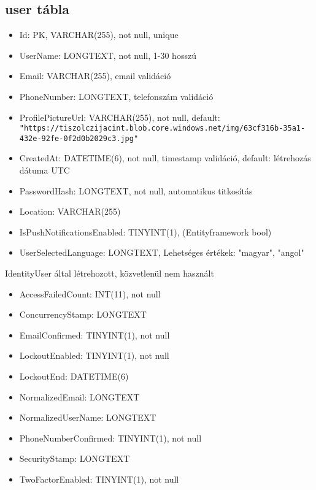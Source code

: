 \documentclass[11pt]{article}
\begin{document}
\subsection{user tábla}
\label{sec:org12ebd85}
\begin{itemize}
\item Id: PK, VARCHAR(255), not null, unique
\item UserName: LONGTEXT, not null, 1-30 hosszú
\item Email: VARCHAR(255), email validáció
\item PhoneNumber: LONGTEXT, telefonszám validáció
\item ProfilePictureUrl: VARCHAR(255), not null,
default: \texttt{"https://tiszolczijacint.blob.core.windows.net/img/63cf316b-35a1-432e-92fe-0f2d0b2029c3.jpg"}
\item CreatedAt: DATETIME(6), not null, timestamp validáció, default: létrehozás dátuma UTC
\item PasswordHash: LONGTEXT, not null, automatikus titkosítás
\item Location: VARCHAR(255)
\item IsPushNotificationsEnabled: TINYINT(1), (Entityframework bool)
\item UserSelectedLanguage: LONGTEXT, Lehetséges értékek: "magyar", "angol"
\end{itemize}

IdentityUser által létrehozott, közvetlenül nem használt
\begin{itemize}
\item AccessFailedCount: INT(11), not null
\item ConcurrencyStamp: LONGTEXT
\item EmailConfirmed: TINYINT(1), not null
\item LockoutEnabled: TINYINT(1), not null
\item LockoutEnd: DATETIME(6)
\item NormalizedEmail: LONGTEXT
\item NormalizedUserName: LONGTEXT
\item PhoneNumberConfirmed: TINYINT(1), not null
\item SecurityStamp: LONGTEXT
\item TwoFactorEnabled: TINYINT(1), not null
\end{itemize}
\end{document}
